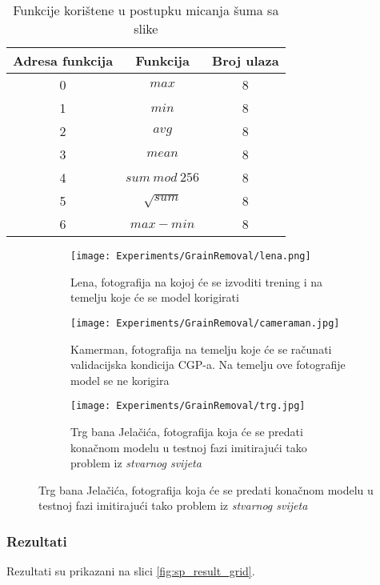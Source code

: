 \begin{table}
	\centering
	\begin{tabular}{||c c c||}
		\hline
		Adresa funkcija & Funkcija & Broj ulaza \\ [0.5ex]
		\hline \hline
		0 & $max$ & 8 \\
		1 & $min$ & 8 \\ 
		2 & $avg$ & 8 \\ 
		3 & $mean$ & 8 \\ 
		4 & $sum\ mod\ 256$ & 8 \\ 
		5 & $\sqrt{sum}$ & 8 \\ 
		6 & $max - min$ & 8 \\ [1ex]
		\hline
	\end{tabular}
	\caption{Funkcije korištene u postupku micanja šuma sa slike}
	\label{table:sp_function_set}
\end{table}

\begin{figure}
	\caption{Fotografije na koje će biti primjenjen šum korištene u trening, validacijskoj i testnoj fazi}
	\begin{subfigure}[t]{0.45\textwidth}
		\texttt{[image: Experiments/GrainRemoval/lena.png]}
		\caption{Lena, fotografija na kojoj će se izvoditi trening i na temelju koje će se model korigirati}
		\label{fig:sp_train_sample}
	\end{subfigure}
	\begin{subfigure}[t]{0.45\textwidth}
		\texttt{[image: Experiments/GrainRemoval/cameraman.jpg]}
		\caption{Kamerman, fotografija na temelju koje će se računati validacijska kondicija CGP-a. Na temelju ove fotografije model se ne korigira}
		\label{fig:sp_val_sample}
	\end{subfigure}
	\begin{subfigure}[t]{0.45\textwidth}
		\texttt{[image: Experiments/GrainRemoval/trg.jpg]}
		\caption{Trg bana Jelačića, fotografija koja će se predati konačnom modelu u testnoj fazi imitirajući tako problem iz \emph{stvarnog svijeta}}
		\label{fig:sp_test_sample}
	\end{subfigure}
	\label{fig:sp_samples}
\end{figure}

\subsubsection{Rezultati}
Rezultati su prikazani na slici \ref{fig:sp_result_grid}.

